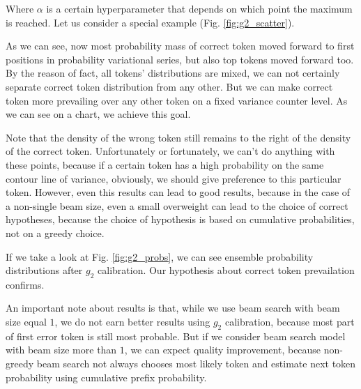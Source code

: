 \documentclass[a4paper,14pt]{extarticle}
\begin{document}
	 Where $\alpha$ is a certain hyperparameter that depends on which point the maximum is reached. Let us consider a special example (Fig. \ref{fig:g2_scatter}).
	
	As we can see, now most probability mass of correct token moved forward to first positions in probability variational series, but also top tokens moved forward too. By the reason of fact, all tokens' distributions are mixed, we can not certainly separate correct token distribution from any other. But we can make correct token more prevailing over any other token on a fixed variance counter level. As we can see on a chart, we achieve this goal.
	
	Note that the density of the wrong token still remains to the right of the density of the correct token. Unfortunately or fortunately, we can't do anything with these points, because if a certain token has a high probability on the same contour line of variance, obviously, we should give preference to this particular token. However, even this results can lead to good results, because in the case of a non-single beam size, even a small overweight can lead to the choice of correct hypotheses, because the choice of hypothesis is based on cumulative probabilities, not on a greedy choice.
	
	If we take a look at Fig. \ref{fig:g2_probs}, we can see ensemble probability distributions after $g_2$ calibration. Our hypothesis about correct token prevailation confirms.
	
	An important note about results is that, while we use beam search with beam size equal $1$, we do not earn better results using $g_2$ calibration, because most part of first error token is still most probable. But if we consider beam search model with beam size more than $1$, we can expect quality improvement, because non-greedy beam search not always chooses most likely token and estimate next token probability using cumulative prefix probability.
\end{document}
